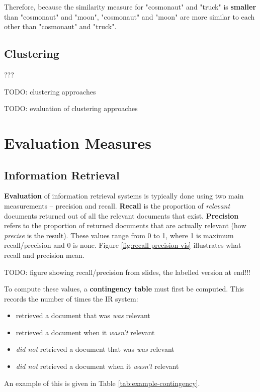 \documentclass{article}
\begin{document}
Therefore, because the similarity measure for "cosmonaut" and "truck" is \textbf{smaller} than "cosmonaut" and "moon", "cosmonaut" and "moon" are more similar to each other than "cosmonaut" and "truck". 

\subsection{Clustering}

???

TODO: clustering approaches

TODO: evaluation of clustering approaches

\section{Evaluation Measures}

\subsection{Information Retrieval}
\label{sec:ir-evaluation}

\textbf{Evaluation} of information retrieval systems is typically done using two main measurements -- precision and recall. \textbf{Recall} is the proportion of \textit{relevant} documents returned out of all the relevant documents that exist. \textbf{Precision} refers to the proportion of returned documents that are actually relevant (how \textit{precise} is the result). These values range from 0 to 1, where 1 is maximum recall/precision and 0 is none. Figure \ref{fig:recall-precision-vis} illustrates what recall and precision mean.

TODO: figure showing recall/precision from slides, the labelled version at end!!!

To compute these values, a \textbf{contingency table} must first be computed. This records the number of times the IR system:
\begin{itemize}
	\item retrieved a document that was \textit{was} relevant
	\item retrieved a document when it \textit{wasn't} relevant
	\item \textit{did not} retrieved a document that was \textit{was} relevant
	\item \textit{did not} retrieved a document when it \textit{wasn't} relevant
\end{itemize}
An example of this is given in Table \ref{tab:example-contingency}.
\end{document}
